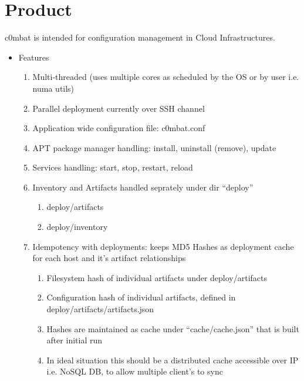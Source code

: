 \documentclass[letterpaper,10pt,english]{sphinxmanual}
\begin{document}
\section{Product}
\label{Introduction:product}
c0mbat is intended for configuration management in Cloud Infrastructures.
\begin{itemize}
\item {} 
Features
\begin{enumerate}
\item {} 
Multi-threaded (uses multiple cores as scheduled by the OS or by user i.e. numa utils)

\item {} 
Parallel deployment currently over SSH channel

\item {} 
Application wide configuration file: c0mbat.conf

\item {} 
APT package manager handling: install, uninstall (remove), update

\item {} 
Services handling: start, stop, restart, reload

\item {} 
Inventory and Artifacts handled seprately under dir ``deploy''
\begin{enumerate}
\item {} 
deploy/artifacts

\item {} 
deploy/inventory

\end{enumerate}

\item {} 
Idempotency with deployments: keeps MD5 Hashes as deployment cache for each host and it's artifact relationships
\begin{enumerate}
\item {} 
Filesystem hash of individual artifacts under deploy/artifacts

\item {} 
Configuration hash of individual artifacts, defined in deploy/artifacts/artifacts.json

\item {} 
Hashes are maintained as cache under ``cache/cache.json'' that is built after initial run

\item {} 
In ideal situation this should be a distributed cache accessible over IP i.e. NoSQL DB, to allow multiple client's to sync


\end{enumerate}
\end{enumerate}
\end{itemize}
\end{document}
